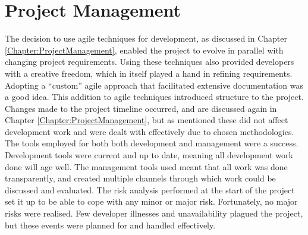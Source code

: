 \section{Project Management}
The decision to use agile techniques for development, as discussed in Chapter \ref{Chapter:ProjectManagement}, enabled the project to evolve in parallel with changing project requirements. Using these techniques also provided developers with a creative freedom, which in itself played a hand in refining requirements. Adopting a ``custom'' agile approach that facilitated extensive documentation was a good idea. This addition to agile techniques introduced structure to the project. Changes made to the project timeline occurred, and are discussed again in Chapter \ref{Chapter:ProjectManagement}, but as mentioned these did not affect development work and were dealt with effectively due to chosen methodologies. The tools employed for both both development and management were a success. Development tools were current and up to date, meaning all development work done will age well. The management tools used meant that all work was done transparently, and created multiple channels through which work could be discussed and evaluated. The risk analysis performed at the start of the project set it up to be able to cope with any minor or major risk. Fortunately, no major risks were realised. Few developer illnesses and unavailability plagued the project, but these events were planned for and handled effectively.